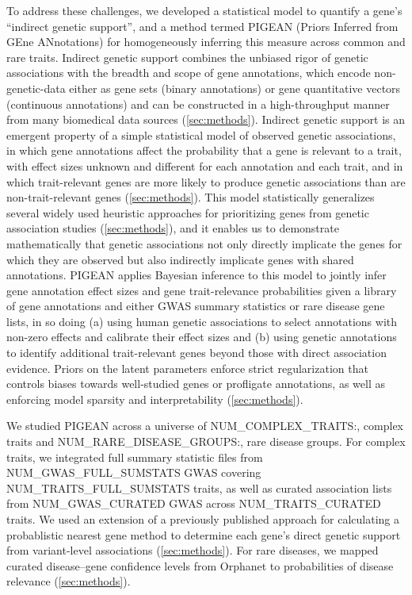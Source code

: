 To address these challenges, we developed a statistical model to quantify a gene's ``indirect genetic support'', and a method termed PIGEAN (Priors Inferred from GEne ANnotations) for homogeneously inferring this measure across common and rare traits. Indirect genetic support combines the unbiased rigor of genetic associations with the breadth and scope of gene annotations, which encode non-genetic-data either as gene sets (binary annotations) or gene quantitative vectors (continuous annotations) and can be constructed in a high-throughput manner from many biomedical data sources (\ref{sec:methods}). Indirect genetic support is an emergent property of a simple statistical model of observed genetic associations, in which gene annotations affect the probability that a gene is relevant to a trait, with effect sizes unknown and different for each annotation and each trait, and in which trait-relevant genes are more likely to produce genetic associations than are non-trait-relevant genes (\ref{sec:methods}).  This model statistically generalizes several widely used heuristic approaches for prioritizing genes from genetic association studies (\ref{sec:methods}), and it enables us to demonstrate mathematically that genetic associations not only directly implicate the genes for which they are observed but also indirectly implicate genes with shared annotations. PIGEAN applies Bayesian inference to this model to jointly infer gene annotation effect sizes and gene trait-relevance probabilities given a library of gene annotations and either GWAS summary statistics or rare disease gene lists, in so doing (a) using human genetic associations to select annotations with non-zero effects and calibrate their effect sizes and (b) using genetic annotations to identify additional trait-relevant genes beyond those with direct association evidence. Priors on the latent parameters enforce strict regularization that controls biases towards well-studied genes or profligate annotations, as well as enforcing model sparsity and interpretability (\ref{sec:methods}).

We studied PIGEAN across a universe of {{NUM_COMPLEX_TRAITS:,}} complex traits and {{NUM_RARE_DISEASE_GROUPS:,}} rare disease groups. For complex traits, we integrated full summary statistic files from {{NUM_GWAS_FULL_SUMSTATS}} GWAS covering {{NUM_TRAITS_FULL_SUMSTATS}} traits, as well as curated association lists from {{NUM_GWAS_CURATED}} GWAS across {{NUM_TRAITS_CURATED}} traits. We used an extension of a previously published approach for calculating a probablistic nearest gene method \cite{dornbos_evaluating_2022} to determine each gene's direct genetic support from variant-level associations (\ref{sec:methods}). For rare diseases, we mapped curated disease–gene confidence levels from Orphanet to probabilities of disease relevance (\ref{sec:methods}).  

